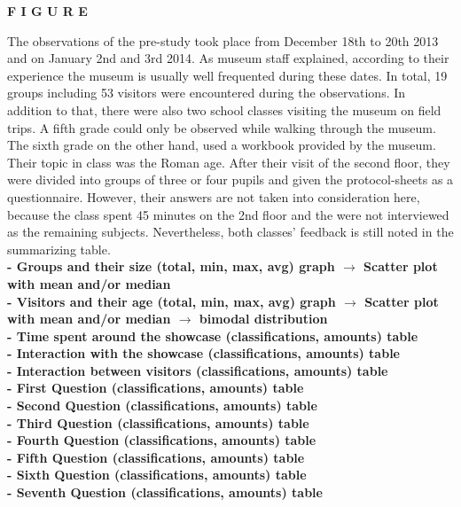 \textbf{F I G U R E}
 
The observations of the pre-study took place from December 18th to 20th 2013 and on January 2nd and 3rd 2014. As museum staff explained, according to their experience the museum is usually well frequented during these dates. In total, 19 groups including 53 visitors were encountered during the observations. In addition to that, there were also two school classes visiting the museum on field trips. A fifth grade could only be observed while walking through the museum. The sixth grade on the other hand, used a workbook provided by the museum. Their topic in class was the Roman age. After their visit of the second floor, they were divided into groups of three or four pupils and given the protocol-sheets as a questionnaire. However, their answers are not taken into consideration here, because the class spent 45 minutes on the 2nd floor and the were not interviewed as the remaining subjects. Nevertheless, both classes' feedback is still noted in the summarizing table.
\\
\textbf{- Groups and their size (total, min, max, avg) graph $\to$ Scatter plot with mean and/or median
\\
- Visitors and their age (total, min, max, avg) graph $\to$ Scatter plot with mean and/or median $\to$ bimodal distribution
\\
- Time spent around the showcase (classifications, amounts) table
\\
- Interaction with the showcase (classifications, amounts) table
\\
- Interaction between visitors (classifications, amounts) table
\\
- First Question (classifications, amounts) table
\\
- Second Question (classifications, amounts) table
\\
- Third Question (classifications, amounts) table
\\
- Fourth Question (classifications, amounts) table
\\
- Fifth Question (classifications, amounts) table
\\
- Sixth Question (classifications, amounts) table
\\
- Seventh Question (classifications, amounts) table}

